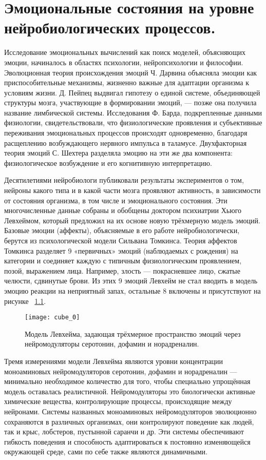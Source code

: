 \chapter{Эмоциональные состояния на уровне нейробиологических процессов.}
\label{chap:theoretical_development}

Исследование эмоциональных вычислений как поиск моделей, объясняющих эмоции, начиналось в областях психологии, нейропсихологии и философии. Эволюционная теория происхождения эмоций Ч. Дарвина объясняла эмоции как приспособительные механизмы, жизненно важные для адаптации организма к условиям жизни. Д. Пейпец выдвигал гипотезу о единой системе, объединяющей структуры мозга, участвующие в формировании эмоций, — позже она получила название лимбической системы. Исследования Ф. Барда, подкрепленные данными физиологии, свидетельствовали, что физиологические проявления и субъективные переживания эмоциональных процессов происходят одновременно, благодаря расщеплению возбуждающего нервного импульса в таламусе. Двухфакторная теория эмоций С. Шехтера разделяла эмоцию на эти же два компонента: физиологическое возбуждение и его когнитивную интерпретацию.


Десятилетиями нейробиологи публиковали результаты экспериментов о том, нейроны какого типа и в какой части мозга проявляют активность, в зависимости от состояния организма, в том числе и эмоционального состояния. Эти многочисленные данные собраны и обобщены доктором психиатрии Хьюго Левхеймом, который предложил на их основе новую трёхмерную модель эмоций.\cite{lovheim2012} Базовые эмоции (аффекты), объясняемые в его работе нейробиологически, берутся из психологической модели Сильвана Томкинса.\cite{tomkins1962, tomkins1963, tomkins1991} Теория аффектов Томкинса разделяет 9 «первичных» эмоций (наблюдаемых с рождения) на категории и соединяет каждую с типичным физиологическим проявлением, позой, выражением лица. Например, злость — покрасневшее лицо, сжатые челюсти, сдвинутые брови. Из этих 9 эмоций Левхейм не стал вводить в модель эмоцию реакции на неприятный запах, остальные 8 включены и присутствуют на рисунке ~\ref{fig:cube_0}.


\begin{figure}
	\centering
	\texttt{[image: cube\_0]}
	\caption{Модель Левхейма, задающая трёхмерное пространство эмоций через нейромодуляторы серотонин, дофамин и норадреналин.\cite{lovheim2012}}
	\label{fig:cube_0}
\end{figure}


Тремя измерениями модели Левхейма являются уровни концентрации моноаминовых нейромодуляторов серотонин, дофамин и норадреналин — минимально необходимое количество для того, чтобы специально упрощённая модель оставалась реалистичной. Нейромодуляторы это биологически активные химические вещества,  контролирующие процессы, происходящие между нейронами. Системы названных моноаминовых нейромодуляторов эволюционно сохраняются в различных организмах, они контролируют поведение как людей, так и крыс, лобстеров, пустынной саранчи и др. Эти системы обеспечивают гибкость поведения и способность адаптироваться к постоянно изменяющейся окружающей среде, сами по себе также являются динамичными.\cite{Benarroch17112009}


